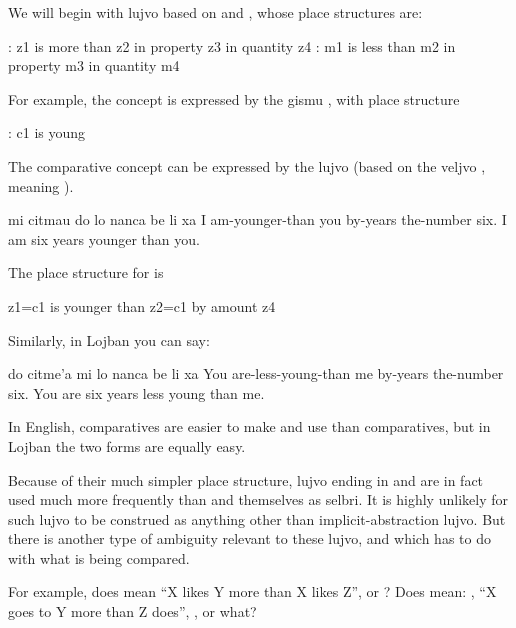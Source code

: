 We will begin with lujvo based on  and ,
    whose place structures are:
\begin{example}
: z1 is more than z2 in property z3\n
\T	in quantity z4\n
{}: m1 is less than m2 in property m3\n
\T	in quantity m4
\end{example}

For example, the concept  is expressed by the gismu
    , with place structure
\begin{example}
:  c1 is young
\end{example}

The comparative concept  can be expressed by the
    lujvo  (based on the veljvo , meaning
    ).
\begin{example}
mi citmau do lo nanca be li xa\n
I am-younger-than you by-years the-number six.\n
I am six years younger than you.
\end{example}

The place structure for  is
\begin{example}
z1=c1 is younger than z2=c1 by amount z4
\end{example}

Similarly, in Lojban you can say:
\begin{example}
do citme'a mi lo nanca be li xa\n
You are-less-young-than me by-years the-number six.\n
You are six years less young than me.
\end{example}

In English,  comparatives are easier to make and use
    than  comparatives, but in Lojban the two forms are
    equally easy.

Because of their much simpler place structure, lujvo ending
    in  and  are in fact used much more frequently
    than  and  themselves as selbri. It is highly
    unlikely for such lujvo to be construed as anything other than
    implicit-abstraction lujvo. But there is another type of
    ambiguity relevant to these lujvo, and which has to do with
    what is being compared.

For example, does  mean ``X likes Y more than X
    likes Z'', or ? Does
     mean: , ``X goes to Y
    more than Z does'', , or
    what?

